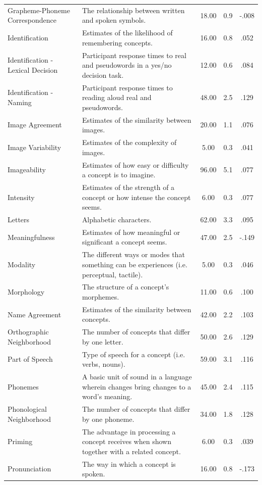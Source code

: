\documentclass[english,man]{apa6}
\theoremstyle{definition}
\theoremstyle{definition}
\theoremstyle{definition}
\theoremstyle{remark}
\begin{document}
\begin{table}[tbp]
\begin{center}
\begin{threeparttable}
\begin{tabular}{llccc}
Grapheme-Phoneme Correspondence & The relationship between written and spoken symbols. & 18.00 & 0.9 & -.008\\
Identification & Estimates of the likelihood of remembering concepts. & 16.00 & 0.8 & .052\\
Identification - Lexical Decision & Participant response times to real and pseudowords in a yes/no decision task. & 12.00 & 0.6 & .084\\
Identification - Naming & Participant response times to reading aloud real and pseudowords. & 48.00 & 2.5 & .129\\
Image Agreement & Estimates of the similarity between images. & 20.00 & 1.1 & .076\\
Image Variability & Estimates of the complexity of images. & 5.00 & 0.3 & .041\\
Imageability & Estimates of how easy or difficulty a concept is to imagine. & 96.00 & 5.1 & .077\\
Intensity & Estimates of the strength of a concept or how intense the concept seems. & 6.00 & 0.3 & .077\\
Letters & Alphabetic characters. & 62.00 & 3.3 & .095\\
Meaningfulness & Estimates of how meaningful or significant a concept seems. & 47.00 & 2.5 & -.149\\
Modality & The different ways or modes that something can be experiences (i.e. perceptual, tactile). & 5.00 & 0.3 & .046\\
Morphology & The structure of a concept's morphemes. & 11.00 & 0.6 & .100\\
Name Agreement & Estimates of the similarity between concepts. & 42.00 & 2.2 & .103\\
Orthographic Neighborhood & The number of concepts that differ by one letter. & 50.00 & 2.6 & .129\\
Part of Speech & Type of speech for a concept (i.e. verbs, nouns). & 59.00 & 3.1 & .116\\
Phonemes & A basic unit of sound in a language wherein changes bring changes to a word's meaning. & 45.00 & 2.4 & .115\\
Phonological Neighborhood & The number of concepts that differ by one phoneme. & 34.00 & 1.8 & .128\\
Priming & The advantage in processing a concept receives when shown together with a related concept. & 6.00 & 0.3 & .039\\
Pronunciation & The way in which a concept is spoken. & 16.00 & 0.8 & -.173\\

\end{tabular}
\end{threeparttable}
\end{center}
\end{table}
\end{document}

